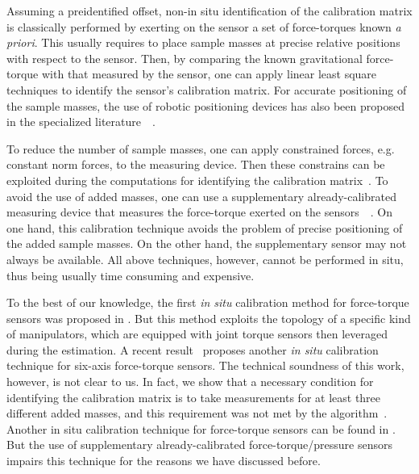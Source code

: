 Assuming a preidentified offset, non-in situ identification of the calibration matrix is classically performed by exerting on  
the sensor a set of force-torques known \emph{a priori}. This usually requires to place 
sample masses at precise relative positions with respect to the sensor. Then, by comparing
the known gravitational force-torque with that measured by the sensor, 
one can apply linear least square techniques to identify the sensor's calibration matrix.
For accurate positioning of the sample masses, the use of robotic positioning devices 
has also been proposed in the specialized 
literature~\citep{uchiyama1991systematic}~\citep{watson1975pedestal}.

To reduce the number of sample masses,
one can apply constrained forces, e.g. constant norm forces, to the measuring device.
Then these constrains can be exploited during the computations for identifying the calibration matrix~\citep{voyles1997}.
To avoid the use of added masses, one can use a supplementary already-calibrated measuring device that measures 
the force-torque exerted on the sensors~\citep{faber2012force}~\citep{oddo2007}.
On one hand, this calibration technique avoids the problem of precise positioning of the added sample masses.
On the other hand, 
the supplementary sensor may not always be available.
All above techniques, however, cannot be performed in situ, thus  being usually time consuming and expensive.


To the best of our knowledge, the first \emph{in situ} calibration method for force-torque sensors was proposed 
in \citep{shimanoroth}. But this method  exploits the topology of a specific kind of manipulators, which are equipped with
joint torque sensors then leveraged during the estimation. 
A recent result~\citep{Gong2013} proposes another \emph{in situ} calibration technique for six-axis force-torque sensors. 
The technical soundness of this work, however, is not clear to us. In fact, we show that a necessary condition for identifying the calibration matrix
is to take measurements for at least three different added masses, and this requirement was not met by the algorithm~\citep{Gong2013}.
Another in situ calibration technique for force-torque sensors can be found in \citep{roozbahani2013}.
But the use of supplementary already-calibrated force-torque/pressure sensors impairs this technique for the reasons we have discussed before. 

